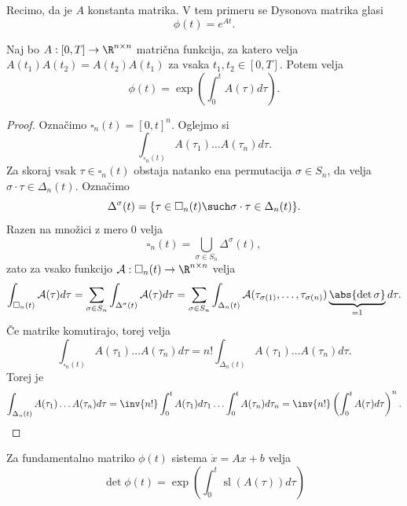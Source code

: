 
Recimo, da je $A$ konstanta matrika.
V tem primeru se Dysonova matrika glasi
\[
  \phi(t) = e^{At}.
\]


\begin{trditev}
  Naj bo $A: [0, T] \to \R^{n \times n}$ matrična funkcija, za katero velja
  $A(t_1) A(t_2) = A(t_2) A(t_1)$ za vsaka $t_1, t_2 \in [0, T]$.
  Potem velja
  \[
	\phi(t) = \exp\left( \int_0^t A(\tau) d\tau \right).
  \]
\end{trditev}

\begin{proof}
  Označimo $\square_n(t) = [0, t]^n$.
  Oglejmo si
  \[
	\int_{\square_n(t)} A(\tau_1) \ldots A(\tau_n) d\tau.
  \]
  Za skoraj vsak $\tau \in \square_n(t)$ obstaja natanko ena permutacija $\sigma
  \in S_n$, da velja $\sigma \cdot \tau \in \Delta_n(t)$.
  Označimo
  \[
	\Delta^\sigma(t)
	= \{ \tau \in \square_n(t) \such \sigma \cdot \tau \in \Delta_n(t) \}.
  \]
  Razen na množici z mero $0$ velja
  \[
	\square_n(t) = \bigcup_{\sigma \in S_n} \Delta^\sigma(t),
  \]
  zato za vsako funkcijo $\mathcal{A}: \square_n(t) \to \R^{n \times n}$ velja
  \[
	\int_{\square_n(t)} \mathcal{A}(\tau) d\tau
	= \sum_{\sigma \in S_n} \int_{\Delta^\sigma(t)} \mathcal{A}(\tau) d\tau
	= \sum_{\sigma \in S_n} \int_{\Delta_n(t)} \mathcal{A}(\tau_{\sigma(1)},
	\ldots, \tau_{\sigma(n)}) \underbrace{\abs{\det \sigma}}_{= 1} d\tau.
  \]
  Če matrike komutirajo, torej velja
  \[
	\int_{\square_n(t)} A(\tau_1) \ldots A(\tau_n) d\tau
	= n! \int_{\Delta_n(t)} A(\tau_1) \ldots A(\tau_n) d\tau.
  \]
  Torej je
  \[
	\int_{\Delta_n(t)} A(\tau_1) \ldots A(\tau_n) d\tau
	= \inv{n!} \int_0^t A(\tau_1) d\tau_1 \ldots \int_0^t A(\tau_n) d\tau_n
	= \inv{n!} \left( \int_0^t A(\tau) d\tau \right)^n.
  \]
\end{proof}


\begin{trditev}
  Za fundamentalno matriko $\phi(t)$ sistema $\dot{x} = Ax + b$ velja
  \[
	\det \phi(t) = \exp\left( \int_0^t \operatorname{sl}(A(\tau)) d\tau \right)
  \]
\end{trditev}

